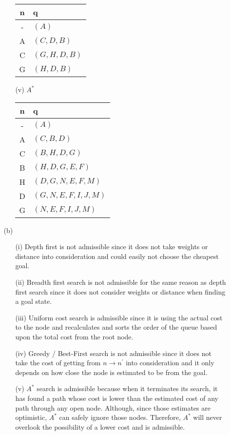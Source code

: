 \begin{enumerate}
\begin{enumerate}
\begin{enumerate}
				\begin{tabular}{c|l}
					\bf{n} & \bf{q} \\
					\hline 
					- & \((A)\) \\
					A & \((C,D,B)\) \\
					C & \((G,H,D,B)\) \\
					G & \((H,D,B)\) \\			
				\end{tabular}
			\item[(v)] $A^*$ \\
				\begin{tabular}{c|l}
					\bf{n} & \bf{q} \\
					\hline 
					- & \((A)\) \\
					A & \((C,B,D)\) \\
					C & \((B,H,D,G)\) \\
					B & \((H,D,G,E,F)\) \\
					H & \((D,G,N,E,F,M)\) \\
					D & \((G,N,E,F,I,J,M)\) \\
					G & \((N,E,F,I,J,M)\) \\			
				\end{tabular}
			\end{enumerate}
		\item[(b)] 
			\begin{enumerate}
				\item[(i)] Depth first is not admissible since it does not take weights or distance into consideration and could easily not choose the cheapest goal. \\
				\item[(ii)] Breadth first search is not admissible for the same reason as depth first search since it does not consider weights or distance when finding a goal state. \\
				\item[(iii)] Uniform cost search is admissible since it is using the actual cost to the node and recalculates and sorts the order of the queue based upon the total cost from the root node. \\
				\item[(iv)] Greedy / Best-First search is not admissible since it does not take the cost of getting from \( n \rightarrow n^{\prime} \) into consideration and it only depends on how close the node is estimated to be from the goal. \\
				\item[(v)] \(A^*\) search is admissible because when it terminates its search, it has found a path whose cost is lower than the estimated cost of any path through any open node. Although, since those estimates are optimistic, \(A^*\) can safely ignore those nodes.  Therefore, \(A^*\) will never overlook the possibility of a lower cost and is admissible. \\

\end{enumerate}
\end{enumerate}
\end{enumerate}
